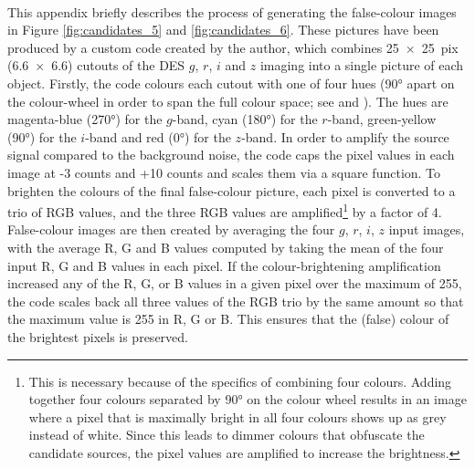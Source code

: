 \paragraph{} This appendix briefly describes the process of generating the false-colour images in Figure \ref{fig:candidates_5} and \ref{fig:candidates_6}. These pictures have been produced by a custom code created by the author, which combines \SI[product-units = repeat]{25 x 25}{pix} (\SI[product-units = repeat]{6.6 x 6.6}{\arcsec}) cutouts of the DES $g$, $r$, $i$ and $z$ imaging into a single picture of each object. Firstly, the code colours each cutout with one of four hues (\ang{90} apart on the colour-wheel in order to span the full colour space; see \citealt{2007AJ....133..598R} and \citealt{2017PASP..129e8007R}). The hues are magenta-blue (\ang{270}) for the $g$-band, cyan (\ang{180}) for the $r$-band, green-yellow (\ang{90}) for the $i$-band and red (\ang{0}) for the $z$-band. In order to amplify the source signal compared to the background noise, the code caps the pixel values in each image at -3 counts and +10 counts and scales them via a square function. To brighten the colours of the final false-colour picture, each pixel is converted to a trio of RGB values, and the three RGB values are amplified\footnote{This is necessary because of the specifics of combining four colours. Adding together four colours separated by \ang{90} on the colour wheel results in an image where a pixel that is maximally bright in all four colours shows up as grey instead of white. Since this leads to dimmer colours that obfuscate the candidate sources, the pixel values are amplified to increase the brightness.} by a factor of 4. False-colour images are then created by averaging the four $g$, $r$, $i$, $z$ input images, with the average R, G and B values computed by taking the mean of the four input R, G and B values in each pixel. If the colour-brightening amplification increased any of the R, G, or B values in a given pixel over the maximum of 255, the code scales back all three values of the RGB trio by the same amount so that the maximum value is 255 in R, G or B. This ensures that the (false) colour of the brightest pixels is preserved.

